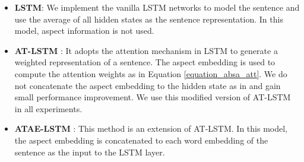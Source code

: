 \documentclass[11pt,a4paper]{article}
\begin{document}
\begin{itemize}
\item {\bf LSTM}: We implement the vanilla LSTM networks to model the sentence and use the average of all hidden states as the sentence representation. In this model, aspect information is not used.

\vspace{-6pt}
\item {\bf AT-LSTM} \cite{Wang2016Attention}: It adopts the attention mechanism in LSTM to generate a weighted representation of a sentence. The aspect embedding is used to compute the attention weights as in Equation \ref{equation_absa_att}. We do not concatenate the aspect embedding to the hidden state as in \cite{Wang2016Attention} and gain small performance improvement. We use this modified version of AT-LSTM in all experiments. 

\vspace{-6pt}
\item {\bf ATAE-LSTM} \cite{Wang2016Attention}: This method is an extension of AT-LSTM. In this model, the aspect embedding is concatenated to each word embedding of the sentence as the input to the LSTM layer. 

\end{itemize}


\begin{table}[t!]
\setlength{\abovecaptionskip}{0.0cm}   %
\setlength{\belowcaptionskip}{-0.2cm}   %
\begin{center}
\end{center}
\caption{\label{table-st} Results of the ALSC task in terms of accuracy ($\%$). All methods are run in single-task settings.}	
\end{table}
\end{document}
